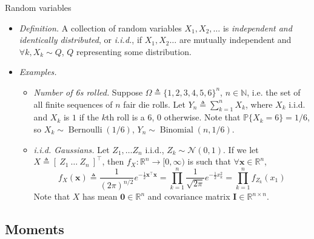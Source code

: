 \documentclass{beamer}
\numberwithin{equation}{section}
\begin{document}
\begin{frame}{Random variables}
	\begin{itemize}
	    \item
        \textit{Definition.} A collection of random variables
        $ X_1, X_2, \ldots $ is \textit{independent and identically
        distributed}, or \textit{i.i.d.}, if $ X_1, X_2 \ldots $ are mutually
        independent and $ \forall k, X_k \sim Q $, $ Q $ representing some
        distribution.

        \item
        \textit{Examples.}
        \begin{itemize}
            \item
            \textit{Number of 6s rolled.} Suppose $ \Omega \triangleq
            \{1, 2, 3, 4, 5, 6\}^n $, $ n \in \mathbb{N} $, i.e. the set of
            all finite sequences of $ n $ fair die rolls. Let
            $ Y_n \triangleq \sum_{k = 1}^nX_k $, where $ X_k $ i.i.d. and
            $ X_k $ is $ 1 $ if the $ k $th roll is a $ 6 $, $ 0 $ otherwise.
            Note that $ \mathbb{P}\{X_k = 6\} = 1 / 6 $, so
            $ X_k \sim \operatorname{Bernoulli}(1 / 6) $,
            $ Y_n \sim \operatorname{Binomial}(n, 1 / 6) $.

            \item
            \textit{i.i.d. Gaussians.} Let $ Z_1, \ldots Z_n $ i.i.d.,
            $ Z_k \sim \mathcal{N}(0, 1) $. If we let
            $ X \triangleq [ \ Z_1 \ \ldots \ Z_n \ ]^\top $, then
            $ f_X : \mathbb{R}^n \rightarrow [0, \infty) $ is such that
            $ \forall \mathbf{x} \in \mathbb{R}^n $,
            \begin{equation*}
                f_X(\mathbf{x}) \triangleq \frac{1}{(2\pi)^{n / 2}}
                e^{-\frac{1}{2}\mathbf{x}^\top\mathbf{x}} =
                \prod_{k = 1}^n\frac{1}{\sqrt{2\pi}}e^{-\frac{1}{2}x_k^2} =
                \prod_{k = 1}^nf_{Z_k}(x_1)
            \end{equation*}
            Note that $ X $ has mean $ \mathbf{0} \in \mathbb{R}^n $ and
            covariance matrix $ \mathbf{I} \in \mathbb{R}^{n \times n} $.
        \end{itemize}
	\end{itemize}
\end{frame}

\subsection{Moments}
\end{document}
